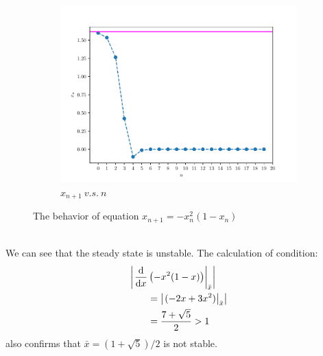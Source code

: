\begin{homeworkProblem}[2]
\begin{enumerate}
\begin{figure}[h]
\begin{subfigure}[t]{0.4\linewidth}
        \includegraphics[scale=0.5]{../fig/fig2(b).pdf}
        \caption{$x_{n+1}\ v.s.\ n$}
    \end{subfigure}
    \centering
    \caption{The behavior of equation $x_{n+1} = -x_n^2(1-x_n)$}
\end{figure}
\\
We can see that the steady state is unstable. The calculation of condition:
\[
    \begin{aligned}
        &\left|\left.\frac{\mathrm{d}}{\mathrm{d}x} \left(-x^2(1-x)\right)\right|_{\bar x}\right|\\
        &\qquad = \left| \left.(-2x + 3x^2)\right|_{\bar x} \right|\\
        &\qquad = \frac{7+\sqrt{5}}{2} > 1
    \end{aligned}
\]
also confirms that $\bar x = (1+\sqrt{5})/2$ is not stable.


\end{enumerate}
\end{homeworkProblem}
